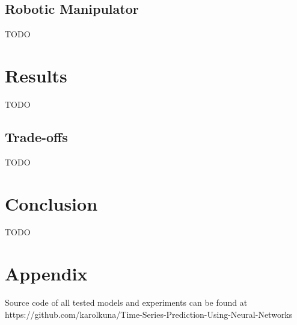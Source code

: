 \documentclass[12pt,oneside]{fithesis2}
\begin{document}
\section{Robotic Manipulator}
TODO

\chapter{Results}
TODO
\section{Trade-offs}
TODO

\chapter{Conclusion}
TODO


    \appendix
    \chapter{Appendix}
    Source code of all tested models and experiments can be found at https://github.com/karolkuna/Time-Series-Prediction-Using-Neural-Networks
    
	
	
    
\end{document}
